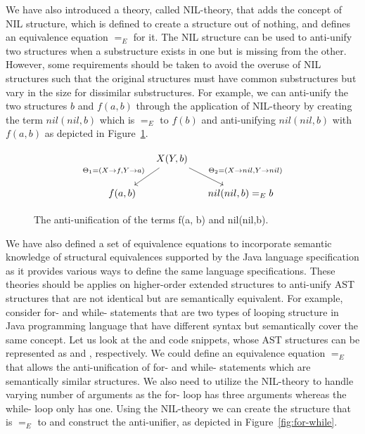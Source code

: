 We have also introduced a theory, called NIL-theory, that adds the concept of NIL structure, which is defined to create a structure out of nothing, and defines an equivalence equation $=_E$ for it. The NIL structure can be used to anti-unify two structures when a substructure exists in one but is missing from the other. However, some requirements should be taken to avoid the overuse of NIL structures such that the original structures must have common substructures but vary in the size for dissimilar substructures. For example, we can anti-unify the two structures $b$ and $f(a,b)$ through the application of NIL-theory by creating the term $nil(nil,b)$ which is $=_E$ to $f(b)$ and anti-unifying $nil(nil,b)$ with $f(a,b)$ as depicted in Figure~\ref{fig:anti-nil}.
\begin{figure} [H]
\[
\begin{tikzcd}[column sep=small]
&
  X(Y,b)
  \arrow{dr}{\Theta_2 = ( X \rightarrow nil, Y \rightarrow nil) }
  \arrow[->,swap]{dl}{\Theta_1 = ( X \rightarrow f, Y \rightarrow a)} %
\\
f(a,b)
&&
nil(nil,b) =_E  b
\end{tikzcd}
\]
  \caption{ The anti-unification of the terms f(a, b) and nil(nil,b).}
  \label{fig:anti-nil}
\end{figure}


We have also defined a set of equivalence equations to incorporate semantic knowledge of structural equivalences supported by the Java language specification as it provides various ways to define the same language specifications. These theories should be applies on higher-order extended structures to anti-unify AST structures that are not identical but are semantically equivalent. For example, consider for- and while- statements that are two types of looping structure in Java programming language that have different syntax but semantically cover the same concept. Let us look at the  and  code snippets, whose AST structures can be represented as  and , respectively. We could define an equivalence equation $=_E$ that allows the anti-unification of for- and while- statements which are semantically similar structures. We also need to utilize the NIL-theory to handle varying number of arguments as the for- loop has three arguments whereas the while- loop only has one. Using the NIL-theory we can create the structure  that is $=_E$ to  and construct the anti-unifier,  as depicted in Figure~\ref{fig:for-while}.

